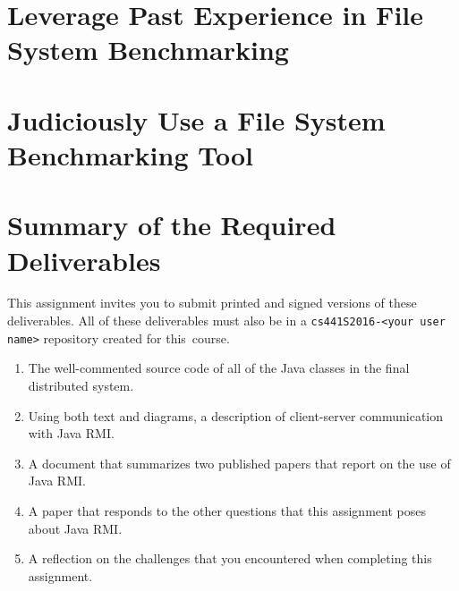 \section*{Leverage Past Experience in File System Benchmarking}



\section*{Judiciously Use a File System Benchmarking Tool}


\section*{Summary of the Required Deliverables}

This assignment invites you to submit printed and signed versions of these deliverables. All of these deliverables must
also be in a {\tt cs441S2016-<your user name>} repository created for \mbox{this course}.

\vspace*{-.1in}

\begin{enumerate}
  \itemsep 0em

  \item The well-commented source code of all of the Java classes in the final distributed system.

  \item Using both text and diagrams, a description of client-server communication with Java RMI.

  \item A document that summarizes two published papers that report on the use of Java RMI.

  \item A paper that responds to the other questions that this assignment poses about Java RMI.

  \item A reflection on the challenges that you encountered when completing this assignment.

\end{enumerate}

\vspace*{-.1in}


